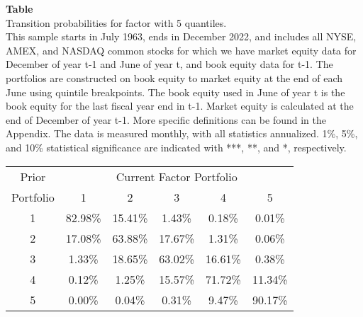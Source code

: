 \begin{table*}[ht!]
\raggedright
{}
\label{tab: transition_probs_meindustry_adjusted_with_5_quantiles}
\textbf{Table \thetable} \\
Transition probabilities for factor with 5 quantiles. \\
\hspace*{1em}This sample starts in July 1963, ends in December 2022, and includes all NYSE, AMEX, and NASDAQ common stocks for which we have market equity data for December of year t-1 and June of year t, and book equity data for t-1. The portfolios are constructed on book equity to market equity at the end of each June using quintile breakpoints.  The book equity used in June of year t is the book equity for the last fiscal year end in t-1.  Market equity is calculated at the end of December of year t-1.  More specific definitions can be found in the Appendix.  The data is measured monthly, with all statistics annualized.  1\%, 5\%, and 10\% statistical significance are indicated with ***, **, and *, respectively. \\
\vspace{0.5em}
\centering
\begin{adjustbox}{max width=\textwidth}
\begin{tabular}{@{}cccccc@{}}
\toprule
Prior & \multicolumn{5}{c}{Current Factor Portfolio} \\
Portfolio & 1 & 2 & 3 & 4 & 5 \\
\midrule
1 & 82.98\% & 15.41\% & 1.43\% & 0.18\% & 0.01\% \\
2 & 17.08\% & 63.88\% & 17.67\% & 1.31\% & 0.06\% \\
3 & 1.33\% & 18.65\% & 63.02\% & 16.61\% & 0.38\% \\
4 & 0.12\% & 1.25\% & 15.57\% & 71.72\% & 11.34\% \\
5 & 0.00\% & 0.04\% & 0.31\% & 9.47\% & 90.17\% \\
\bottomrule
\end{tabular}
\end{adjustbox}
\end{table*}